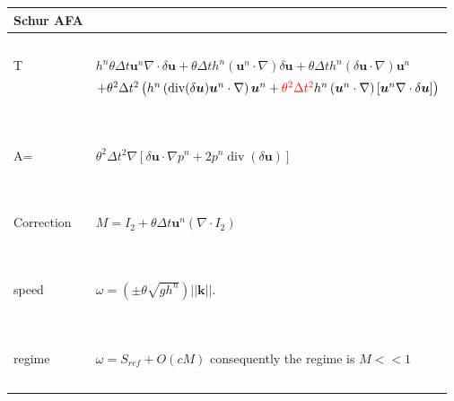 \documentclass[a4paper, 11pt]{article}
\begin{document}
\begin{table}
\begin{tabular}{|l|l|}
  \hline
  Schur AFA &  \\
  \hline
  ~ & ~\\
  T &  $h^n\theta\Delta t\boldsymbol{u}^n\nabla \cdot \delta \boldsymbol{u}+\theta\Delta th^n\left(\boldsymbol{u}^n\cdot \nabla \right)\delta \boldsymbol{u}+\theta\Delta th^n\left(\delta \boldsymbol{u}\cdot \nabla\right)\boldsymbol{u}^n$\\
&$+\theta^2\Delta t^2 \left( h^n\left(\text{div}(\delta \boldsymbol{u})\boldsymbol{u}^n\cdot \nabla\right)\boldsymbol{u}^n+\textcolor{red}{\theta^2\Delta t^2}h^n\left(\boldsymbol{u}^n\cdot \nabla\right)\left[\boldsymbol{u}^n\nabla \cdot \delta \boldsymbol{u}\right]\right)$ \\ 
  ~ & ~\\
    \hline
   ~& ~\\ 
  A= & $\theta^2 \Delta t^2 \nabla\left[ \delta \boldsymbol{u}\cdot \nabla p^n + 2p^n \operatorname{div}(\delta \boldsymbol{u}) \right] $\\
  ~ & ~\\
      \hline
     ~ &~ \\
   Correction &  $M=I_2+\theta\Delta t\boldsymbol{u}^n(\nabla\cdot I_2)$ \\ 
   ~ & ~\\
    \hline
     ~ &~ \\
  speed & $\omega=\left(\pm\theta\sqrt{gh^n}\right)||\boldsymbol{k}||.$ \\ 
   ~ & ~\\
    \hline
    ~& ~\\
  regime & $\omega=S_{ref}+O(cM)$ consequently the regime is $M<< 1$\\
   ~& ~\\
    \hline
\end{tabular}
\end{table}
\end{document}
